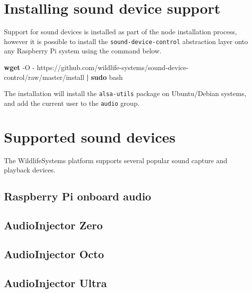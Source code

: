 \documentclass[
]{book}
\newenvironment{Shaded}{\begin{snugshade}}{\end{snugshade}}
\newcommand{\AttributeTok}[1]{\textcolor[rgb]{0.13,0.29,0.53}{#1}}
\newcommand{\FunctionTok}[1]{\textcolor[rgb]{0.13,0.29,0.53}{\textbf{#1}}}
\newcommand{\KeywordTok}[1]{\textcolor[rgb]{0.13,0.29,0.53}{\textbf{#1}}}
\newcommand{\NormalTok}[1]{#1}
\begin{document}
\section{Installing sound device support}\label{installing-sound-device-support}

Support for sound devices is installed as part of the node installation process, however it is possible to install the \texttt{sound-device-control} abstraction layer onto any Raspberry Pi system using the command below.

\begin{Shaded}
\begin{Highlighting}[]
\KeywordTok{\textasciigrave{}}\FunctionTok{wget} \AttributeTok{{-}O} \AttributeTok{{-}}\NormalTok{ https://github.com/wildlife{-}systems/sound{-}device{-}control/raw/master/install }\KeywordTok{|} \FunctionTok{sudo}\NormalTok{ bash}\KeywordTok{\textasciigrave{}}
\end{Highlighting}
\end{Shaded}

The installation will install the \texttt{alsa-utils} package on Ubuntu/Debian systems, and add the current user to the \texttt{audio} group.

\section{Supported sound devices}\label{supported-sound-devices}

The WildlifeSystems platform supports several popular sound capture and playback devices.

\subsection{Raspberry Pi onboard audio}\label{raspberry-pi-onboard-audio}

\subsection{AudioInjector Zero}\label{audioinjector-zero}

\subsection{AudioInjector Octo}\label{audioinjector-octo}

\subsection{AudioInjector Ultra}\label{audioinjector-ultra}
\end{document}
